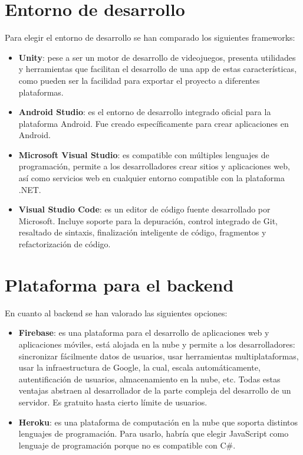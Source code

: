 \section{Entorno de desarrollo}
Para elegir el entorno de desarrollo se han comparado los siguientes frameworks:

\begin{itemize}
\item \textbf{Unity}: pese a ser un motor de desarrollo de videojuegos, presenta utilidades y herramientas que facilitan el desarrollo de una app de estas características, como pueden ser la facilidad para exportar el proyecto a diferentes plataformas.

\item \textbf{Android Studio}: es el entorno de desarrollo integrado oficial para la plataforma Android. Fue creado específicamente para crear aplicaciones en Android.

\item \textbf{Microsoft Visual Studio}: es compatible con múltiples lenguajes de programación, permite a los desarrolladores crear sitios y aplicaciones web, así como servicios web en cualquier entorno compatible con la plataforma .NET.

\item \textbf{Visual Studio Code}: es un editor de código fuente desarrollado por Microsoft. Incluye soporte para la depuración, control integrado de Git, resaltado de sintaxis, finalización inteligente de código, fragmentos y refactorización de código.
\end{itemize}

\section{Plataforma para el backend}
En cuanto al backend se han valorado las siguientes opciones:

\begin{itemize}
\item \textbf{Firebase}: es una plataforma para el desarrollo de aplicaciones web y aplicaciones móviles, está alojada en la nube y permite a los desarrolladores: sincronizar fácilmente datos de usuarios, usar herramientas multiplataformas, usar la infraestructura de Google, la cual, escala automáticamente, autentificación de usuarios, almacenamiento en la nube, etc. Todas estas ventajas abstraen al desarrollador de la parte compleja del desarrollo de un servidor. Es gratuito hasta cierto límite de usuarios.

\item \textbf{Heroku}: es una plataforma de computación en la nube que soporta distintos lenguajes de programación. Para usarlo, habría que elegir JavaScript como lenguaje de programación porque no es compatible con C\#. 
\end{itemize}

